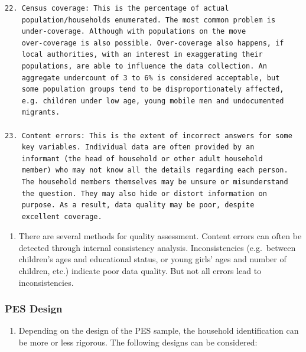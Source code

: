 \documentclass[
]{article}
\providecommand{\tightlist}{%
  \setlength{\itemsep}{0pt}\setlength{\parskip}{0pt}}
\begin{document}
\begin{verbatim}
22. Census coverage: This is the percentage of actual
    population/households enumerated. The most common problem is
    under-coverage. Although with populations on the move
    over-coverage is also possible. Over-coverage also happens, if
    local authorities, with an interest in exaggerating their
    populations, are able to influence the data collection. An
    aggregate undercount of 3 to 6% is considered acceptable, but
    some population groups tend to be disproportionately affected,
    e.g. children under low age, young mobile men and undocumented
    migrants.

23. Content errors: This is the extent of incorrect answers for some
    key variables. Individual data are often provided by an
    informant (the head of household or other adult household
    member) who may not know all the details regarding each person.
    The household members themselves may be unsure or misunderstand
    the question. They may also hide or distort information on
    purpose. As a result, data quality may be poor, despite
    excellent coverage.
\end{verbatim}

\begin{enumerate}
\def\labelenumi{\arabic{enumi}.}
\setcounter{enumi}{111}
\tightlist
\item
  There are several methods for quality assessment. Content errors
  can often be detected through internal consistency analysis.
  Inconsistencies (e.g.~between children's ages and educational
  status, or young girls' ages and number of children, etc.) indicate
  poor data quality. But not all errors lead to inconsistencies.
\end{enumerate}

\hypertarget{a.2.-pes-design}{%
\subsubsection{PES Design}\label{a.2.-pes-design}}

\begin{enumerate}
\def\labelenumi{\arabic{enumi}.}
\setcounter{enumi}{112}
\tightlist
\item
  Depending on the design of the PES sample, the household
  identification can be more or less rigorous. The following designs
  can be considered:
\end{enumerate}
\end{document}
